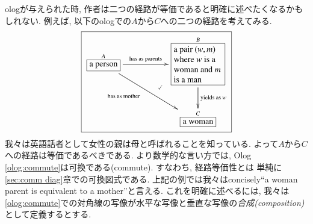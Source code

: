 ologが与えられた時, 作者は二つの経路が等価であると明確に述べたくなるかもしれない. 例えば, 以下のologでの$A$から$C$への二つの経路を考えてみる.
\begin{align}\label{olog:commute}\fbox{\xymatrixnocompile{\smbox{A}{a person}\LA{rr}{has as parents}\LAL{drr}{\parbox{.8in}{has as mother}}&&\obox{B}{.8in}{\rr a pair $(w,m)$ where $w$ is a woman and $m$ is a man}\ar@{}[dll]|(.4){\checkmark}\LA{d}{yields as $w$}\\&&\smbox{C}{a woman}}}\end{align} 我々は英語話者として女性の親は母と呼ばれることを知っている. よって$A$から$C$への経路は等価であるべきである. より数学的な言い方では, Olog \eqref{olog:commute}は{可換である(commute)}. すなわち, 経路等価性とは
単純に\ref{sec:comm diag}章での可換図式である. 上記の例では我々はconcisely``a woman parent is equivalent to a mother''と言える. これを明確に述べるには, 我々は\eqref{olog:commute}での対角線の写像が水平な写像と垂直な写像の\emph{合成(composition)}として定義するとする.


